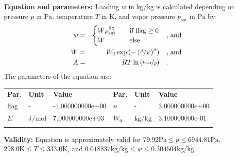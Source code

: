 \textbf{Equation and parameters:}
\newline
%
Loading $w$ in $\si{\kilogram\per\kilogram}$ is calculated depending on pressure $p$ in $\si{\pascal}$, temperature $T$ in $\si{\kelvin}$, and vapor pressure $p_\mathrm{sat}$ in $\si{\pascal}$ by:
%
\begin{equation*}
\begin{split}
w &=& \begin{cases} W \rho_\mathrm{sat}^{\mathrm{liq}} & \quad \text{if flag} \geq 0 \\ W & \quad \text{else} \end{cases} & \quad\text{, and} \\
W &=& W_0 \exp \left( - \left( \nicefrac{A}{E} \right) ^{n} \right) & \quad\text{, and} \\
A &=& R T \ln \left( \nicefrac{p_\mathrm{sat}}{p} \right) & \quad\text{.} \\
\end{split}
\end{equation*}
%
The parameters of the equation are:
%
\begin{longtable}[l]{lll|lll}
\toprule
\addlinespace
\textbf{Par.} & \textbf{Unit} & \textbf{Value} &	\textbf{Par.} & \textbf{Unit} & \textbf{Value} \\
\addlinespace
\midrule
\endhead

\bottomrule
\endfoot
\bottomrule
\endlastfoot
\addlinespace

flag & - & -1.000000000e+00 & $n$ & - & 3.000000000e+00 \\
$E$ & $\si{\joule\per\mole}$ & 7.000000000e+03 & $W_0$ & $\si{\kilogram\per\kilogram}$ & 3.100000000e-01 \\

\addlinespace\end{longtable}

\textbf{Validity:}
\newline
Equation is approximately valid for $79.92 \si{\pascal} \leq p \leq 6944.81 \si{\pascal}$,  $298.0 \si{\kelvin} \leq T \leq 333.0 \si{\kelvin}$, and $0.018837 \si{\kilogram\per\kilogram} \leq w \leq 0.304504 \si{\kilogram\per\kilogram}$.
\newline

